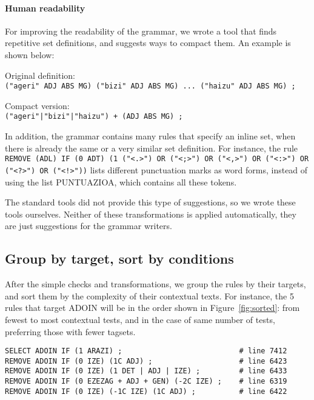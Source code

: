 \documentclass[11pt]{article}
\begin{document}

\paragraph{Human readability}
For improving the readability of the grammar, we wrote a tool that finds repetitive set definitions, and suggests ways to compact them. An example is shown below:

Original definition: \\
\texttt{("ageri" ADJ ABS MG) ("bizi" ADJ ABS MG) ... ("haizu" ADJ ABS MG) ;}

Compact version: \\
\texttt{("ageri"|"bizi"|"haizu") + (ADJ ABS MG) ;}


In addition, the grammar contains many rules that specify an inline set, when there is already the same or a very similar set definition. For instance, the rule \texttt{REMOVE (ADL) IF (0 ADT) (1 ("<.>") OR ("<;>") OR ("<,>") OR ("<:>") OR ("<?>") OR ("<!>"))} lists different punctuation marks as word forms, instead of using the list PUNTUAZIOA, which contains all these tokens.

The standard tools did not provide this type of suggestions, so we wrote these tools ourselves. Neither of these transformations is applied automatically, they are just suggestions for the grammar writers.



\subsection{Group by target, sort by conditions}
After the simple checks and transformations, we group the rules by their targets, and sort them by the complexity of their contextual texts. For instance, the 5 rules that target ADOIN will be in the order shown in Figure~\ref{fig:sorted}: from fewest to most contextual tests, and in the case of same number of tests, preferring those with fewer tagsets.

\begin{figure*}[t]
\label{fig:sorted}
\begin{verbatim}
SELECT ADOIN IF (1 ARAZI) ;                           # line 7412
REMOVE ADOIN IF (0 IZE) (1C ADJ) ;                    # line 6423
REMOVE ADOIN IF (0 IZE) (1 DET | ADJ | IZE) ;         # line 6433
REMOVE ADOIN IF (0 EZEZAG + ADJ + GEN) (-2C IZE) ;    # line 6319
REMOVE ADOIN IF (0 IZE) (-1C IZE) (1C ADJ) ;          # line 6422
\end{verbatim}
\caption{Rules grouped by target, and ordered by their contextual tests.}
\end{figure*}
\end{document}
